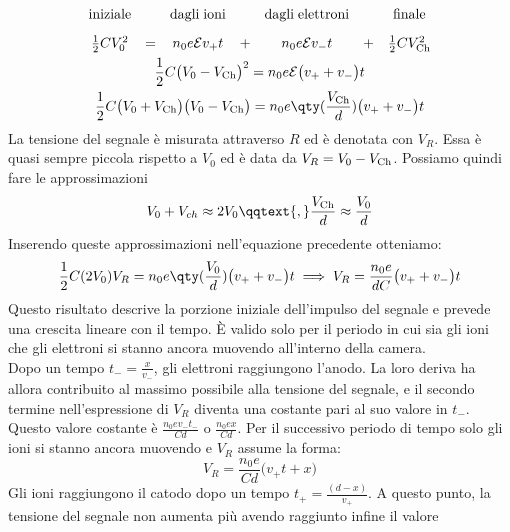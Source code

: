 \begin{approfondimento}
\begin{gather*}
\begin{array}{ccccccc}
         \rm iniziale &  & \rm dagli \; ioni &  & \rm dagli \; elettroni &  & \rm finale\\[0.3cm]
         \frac{1}{2}CV_0^2 & = & n_0 e \mathcal{E} v_{+} t & + & n_0 e \mathcal{E} v_{-} t & + & \frac{1}{2}CV_{\rm Ch}^2
      \end{array}
      \\
      \frac{1}{2}C \bigl( V_0 - V_{\rm Ch} \bigr)^2
      =n_0 e \mathcal{E} \bigl( v_{+} + v_{-} \bigr) t
      \\
      \frac{1}{2}C \bigl( V_0 + V_{\rm Ch} \bigr)\bigl( V_0 - V_{\rm Ch} \bigr)
      =n_0 e \qty( \frac{V_{\rm Ch}}{d} ) \bigl( v_{+} + v_{-} \bigr) t
   \end{gather*}
   La tensione del segnale è misurata attraverso $R$ ed è denotata con $V_R$. Essa è quasi sempre piccola rispetto a $V_0$ ed è data da $V_R=V_0-V_{\rm Ch}$. Possiamo quindi fare le approssimazioni
   \begin{equation*}
      V_0 + V_{ch} \approx 2 V_0
      \qqtext{,}
      \frac{V_{\rm Ch}}{d} \approx \frac{V_0}{d}
   \end{equation*}
   Inserendo queste approssimazioni nell'equazione precedente otteniamo:
   \begin{gather*}
      \frac{1}{2}C(2V_0)V_R=n_0 e \qty( \frac{V_0}{d} ) \bigl( v_{+} + v_{-} \bigr) t
      \implies
      V_R=\frac{n_0 e}{d C} \bigl( v_{+} + v_{-} \bigr) t
   \end{gather*}
   Questo risultato descrive la porzione iniziale dell'impulso del segnale e prevede una crescita lineare con il tempo. È valido solo per il periodo in cui sia gli ioni che gli elettroni si stanno ancora muovendo all'interno della camera.\\
   Dopo un tempo $t_{-}=\frac{x}{v_{-}}$, gli elettroni raggiungono l'anodo. La loro deriva ha allora contribuito al massimo possibile alla tensione del segnale, e il secondo termine nell'espressione di $V_R$ diventa una costante pari al suo valore in $t_{-}$. Questo valore costante è $\frac{n_0 e v_{-} t_{-}}{Cd}$ o $\frac{n_0 e x}{Cd}$. Per il successivo periodo di tempo solo gli ioni si stanno ancora muovendo e $V_R$ assume la forma:
   \begin{equation*}
      V_R=\frac{n_0 e}{Cd} \bigl( v_{+} t + x\bigr)
   \end{equation*}
   Gli ioni raggiungono il catodo dopo un tempo $ t_+ = \frac{(d - x)}{v_{+}} $. A questo punto, la tensione del segnale non aumenta più avendo raggiunto infine il valore
   \begin{equation*}

\end{equation*}
\end{approfondimento}
